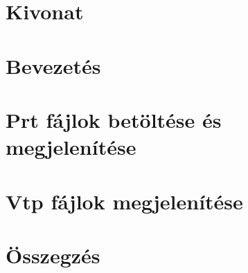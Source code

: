 \documentclass[11pt,twoside]{report}
\begin{document}


\pagestyle{empty}
\tableofcontents



\chapter*{Kivonat}


%
\pagestyle{fancy}
\renewcommand{\chaptermark}[1]{\markboth{#1}{}}
\chapter{Bevezetés}


\chapter{Prt fájlok betöltése és megjelenítése}


\chapter{Vtp fájlok megjelenítése}


\chapter{Összegzés}


\renewcommand{\bibname}{Irodalomjegyzék}
\nocite{*}
\clearpage
{}
{}
\printbibliography

\pagestyle{empty}

\clearpage
{}
{}
\listoffigures
\end{document}
